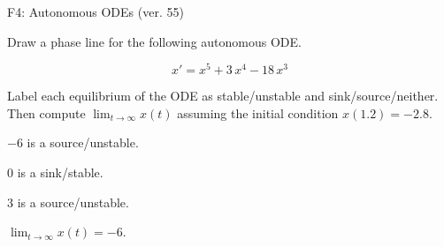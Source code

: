 \begin{exercise}
  \begin{exerciseTitle}F4: Autonomous ODEs (ver. 55)\end{exerciseTitle}
  \begin{exerciseStatement}
    

      Draw a phase line for the following 
      autonomous ODE.
    

    
\[x'= x^{5} + 3 \, x^{4} - 18 \, x^{3}\]

    

      Label each equilibrium of the ODE
      as stable/unstable and sink/source/neither.
      Then compute \(\lim_{t\to\infty}x(t)\)
      assuming the initial condition
      \(x( 1.2 )= -2.8\).
    

  \end{exerciseStatement}
  \begin{exerciseAnswer}
    

      \(-6\) is a source/unstable.
      
        \(0\) is a sink/stable.
      
      \(3\) is a source/unstable.
    

    

      \(\lim_{t\to\infty}x(t)=-6\).
    

  \end{exerciseAnswer}
\end{exercise}